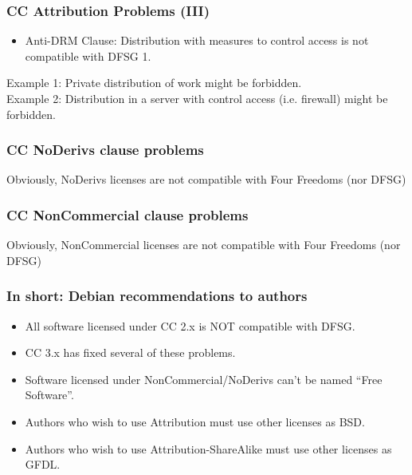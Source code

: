 \documentclass{beamer}
\begin{document}

\begin{frame}
\frametitle{CC Attribution Problems (III)}

\begin{itemize}
\item Anti-DRM Clause: Distribution with measures to control access is not compatible with DFSG 1.
\end{itemize}

Example 1: Private distribution of work might be forbidden.\\
Example 2: Distribution in a server with control access (i.e. firewall) might be forbidden.
\end{frame}


\begin{frame}
\frametitle{CC NoDerivs clause problems}

\LARGE{Obviously, NoDerivs licenses are not compatible with Four Freedoms (nor DFSG)}

\end{frame}


\begin{frame}
\frametitle{CC NonCommercial clause problems}

\LARGE{Obviously, NonCommercial licenses are not compatible with Four Freedoms (nor DFSG)}

\end{frame}



\begin{frame}
\frametitle{In short: Debian recommendations to authors}

\begin{itemize}
\item All software licensed under CC 2.x is NOT compatible with DFSG. 
\item CC 3.x has fixed several of these problems.
\item Software licensed under NonCommercial/NoDerivs can't be named ``Free Software''.
\item Authors who wish to use Attribution must use other licenses as BSD.
\item Authors who wish to use Attribution-ShareAlike must use other licenses as GFDL.
\end{itemize}

\end{frame}



\end{document}
